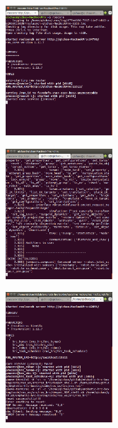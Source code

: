 \begin{enumerate}
\begin{minipage}{0.3\textwidth}
\centering
	\includegraphics[width=4cm]{Pictures/run/roscorerun.png}
	\label{fig:roscorerun}
\end{minipage}
\quad
\begin{minipage}{0.3\textwidth}
\centering
	\includegraphics[width=4cm]{Pictures/run/morserun.png}
	\label{fig:morserun}
\end{minipage}
\quad
\begin{minipage}{0.3\textwidth}
\centering
	\includegraphics[width=4cm]{Pictures/run/ROSnoderun.png}
	\label{fig:ROSnoderun}
\end{minipage}


\end{enumerate}
